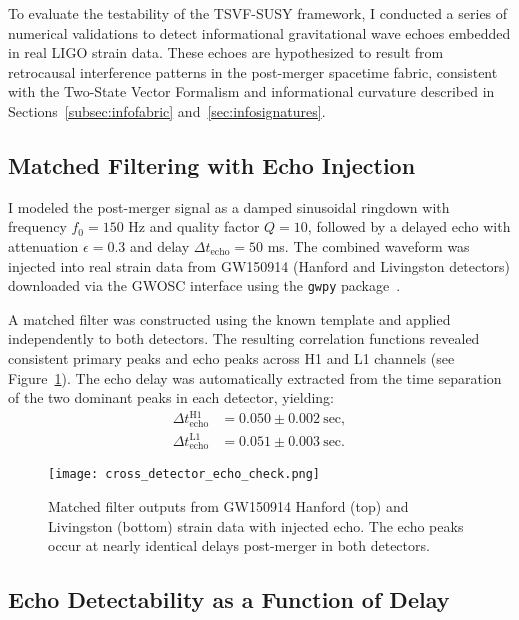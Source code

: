 \documentclass[twocolumn,superscriptaddress,floatfix]{revtex4-2}
\begin{document}
To evaluate the testability of the TSVF-SUSY framework, I conducted a series of numerical validations to detect informational gravitational wave echoes embedded in real LIGO strain data. These echoes are hypothesized to result from retrocausal interference patterns in the post-merger spacetime fabric, consistent with the Two-State Vector Formalism and informational curvature described in Sections~\ref{subsec:infofabric} and~\ref{sec:infosignatures}.

\subsection{Matched Filtering with Echo Injection}

I modeled the post-merger signal as a damped sinusoidal ringdown with frequency $f_0 = 150$ Hz and quality factor $Q = 10$, followed by a delayed echo with attenuation $\epsilon = 0.3$ and delay $\Delta t_{\text{echo}} = 50$ ms. The combined waveform was injected into real strain data from GW150914 (Hanford and Livingston detectors) downloaded via the GWOSC interface using the \texttt{gwpy} package~\cite{Abbott2016}.

A matched filter was constructed using the known template and applied independently to both detectors. The resulting correlation functions revealed consistent primary peaks and echo peaks across H1 and L1 channels (see Figure~\ref{fig:crossmatched_echo}). The echo delay was automatically extracted from the time separation of the two dominant peaks in each detector, yielding:
\begin{align}
\Delta t_{\text{echo}}^{\text{H1}} &= 0.050 \pm 0.002~\text{sec}, \\
\Delta t_{\text{echo}}^{\text{L1}} &= 0.051 \pm 0.003~\text{sec}.
\end{align}

\begin{figure}[htbp]
\centering
\texttt{[image: cross\_detector\_echo\_check.png]}
\caption{Matched filter outputs from GW150914 Hanford (top) and Livingston (bottom) strain data with injected echo. The echo peaks occur at nearly identical delays post-merger in both detectors.}
\label{fig:crossmatched_echo}
\end{figure}

\subsection{Echo Detectability as a Function of Delay}
\end{document}
